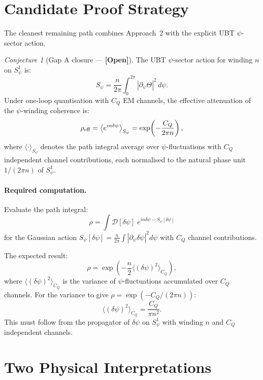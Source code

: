 \documentclass[12pt,a4paper]{article}
\theoremstyle{definition}\newtheorem{definition}[theorem]{Definition}
\theoremstyle{remark}\newtheorem{remark}[theorem]{Remark}
\newtheorem{conjecture}[theorem]{Conjecture}
\newcommand{\OPEN}{\textbf{[Open]}}
\begin{document}
\section{Candidate Proof Strategy}
\label{sec:strategy}

The cleanest remaining path combines Approach~2 with the
explicit UBT $\psi$-sector action.

\begin{conjecture}[Gap A closure — \OPEN]
\label{conj:gapA}
The UBT $\psi$-sector action for winding $n$ on $S^1_\psi$ is:
\[
  S_\psi = \frac{n}{2\pi}\int_0^{2\pi}|\partial_\psi\Theta|^2\,d\psi.
\]
Under one-loop quantisation with $C_Q$ EM channels, the effective
attenuation of the $\psi$-winding coherence is:
\[
  \rho_{\rm eff}
  = \left\langle e^{i n \delta\psi}\right\rangle_{S_\psi}
  = \exp\!\left(-\frac{C_Q}{2\pi n}\right),
\]
where $\langle\cdot\rangle_{S_\psi}$ denotes the path integral
average over $\psi$-fluctuations with $C_Q$ independent channel
contributions, each normalised to the natural phase unit
$1/(2\pi n)$ of $S^1_\psi$.
\end{conjecture}

\paragraph{Required computation.}
Evaluate the path integral:
\[
  \rho = \int \mathcal{D}[\delta\psi]\;
  e^{i n \delta\psi - S_\psi[\delta\psi]}
\]
for the Gaussian action $S_\psi[\delta\psi]
= \tfrac{n}{2\pi}\int|\partial_\psi\delta\psi|^2 d\psi$
with $C_Q$ channel contributions.

The expected result:
\[
  \rho = \exp\!\left(-\frac{n}{2} \langle(\delta\psi)^2\rangle_{C_Q}\right),
\]
where $\langle(\delta\psi)^2\rangle_{C_Q}$ is the variance of
$\psi$-fluctuations accumulated over $C_Q$ channels.
For the variance to give $\rho = \exp(-C_Q/(2\pi n))$:
\[
  \langle(\delta\psi)^2\rangle_{C_Q}
  = \frac{C_Q}{\pi n^2}.
\]
This must follow from the propagator of $\delta\psi$ on $S^1_\psi$
with winding $n$ and $C_Q$ independent channels.

\section{Two Physical Interpretations}
\label{sec:interpretations}
\end{document}
